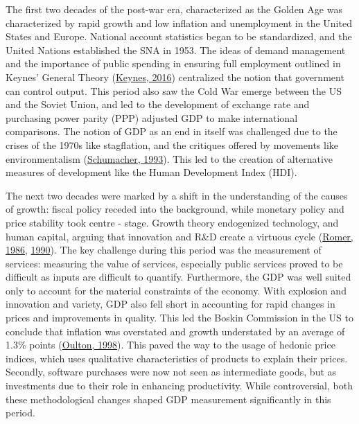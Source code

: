 \documentclass[12pt,nobind, a4paper]{reedthesis}
\begin{document}
 The first two decades of the post-war era, characterized as the Golden Age was characterized by rapid growth and low inflation and unemployment in the United States and Europe. National account statistics began to be standardized, and the United Nations established the SNA in 1953. The ideas of demand management and the importance of public spending in ensuring full employment outlined in Keynes' General Theory (\protect\hyperlink{ref-keynes_general_2016}{Keynes, 2016}) centralized the notion that government can control output. This period also saw the Cold War emerge between the US and the Soviet Union, and led to the development of exchange rate and purchasing power parity (PPP) adjusted GDP to make international comparisons. The notion of GDP as an end in itself was challenged due to the crises of the 1970s like stagflation, and the critiques offered by movements like environmentalism (\protect\hyperlink{ref-schumacher_small_1993}{Schumacher, 1993}). This led to the creation of alternative measures of development like the Human Development Index (HDI).
 \linebreak

 The next two decades were marked by a shift in the understanding of the causes of growth: fiscal policy receded into the background, while monetary policy and price stability took centre - stage. Growth theory endogenized technology, and human capital, arguing that innovation and R\&D create a virtuous cycle (\protect\hyperlink{ref-romer_increasing_1986}{Romer, 1986}, \protect\hyperlink{ref-romer_endogenous_1990}{1990}). The key challenge during this period was the measurement of services: measuring the value of services, especially public services proved to be difficult as inputs are difficult to quantify. Furthermore, the GDP was well suited only to account for the material constraints of the economy. With explosion and innovation and variety, GDP also fell short in accounting for rapid changes in prices and improvements in quality. This led the Boskin Commission in the US to conclude that inflation was overstated and growth understated by an average of 1.3\% points (\protect\hyperlink{ref-oulton_implications_1998}{Oulton, 1998}). This paved the way to the usage of hedonic price indices, which uses qualitative characteristics of products to explain their prices. Secondly, software purchases were now not seen as intermediate goods, but as investments due to their role in enhancing productivity. While controversial, both these methodological changes shaped GDP measurement significantly in this period.
 \linebreak
\end{document}
